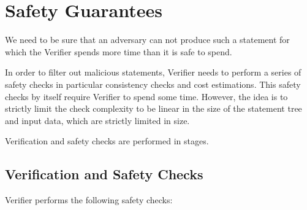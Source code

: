 \documentclass[11pt]{llncs}
\newcommand{\authnote}[2]{\marginpar{\parbox{\marginparwidth}{\tiny %
  \textsf{#1 {\textcolor{blue}{notes: #2}}}}}%
  \textcolor{blue}{\textbf{\dag}}}
\newcommand{\authnote}[2]{
  \textsf{#1 \textcolor{blue}{: #2}}}
\newcommand{\authnote}[2]{}
\newcommand{\knote}[1]{{\authnote{\textcolor{green}{kushti notes}}{#1}}}
\begin{document}
\section{Safety Guarantees}
\label{sec:safety}

We need to be sure that an adversary can not produce such a statement for
which the Verifier spends more time than it is safe to spend. \knote{links to
verifier dilemma, orphan rates etc}

In order to filter out malicious statements, Verifier needs to perform a
series of safety checks in particular consistency checks and cost
estimations. This safety checks by itself require Verifier to spend some
time. However, the idea is to strictly limit the check complexity to be
linear in the size of the statement tree and input data, which are strictly
limited in size.

Verification and safety checks are performed in stages.

\subsection{Verification and Safety Checks}
\label{sec:safety-checks}

Verifier performs the following safety checks:
\end{document}
